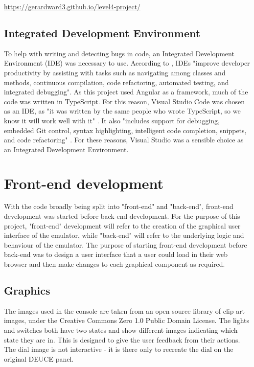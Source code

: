 \documentclass{l4proj}
\begin{document}
 \url{https://gerardward3.github.io/level4-project/}
 
\subsection{Integrated Development Environment}
To help with writing and detecting bugs in code, an Integrated Development Environment (IDE) was necessary to use. According to \citet{ide15}, IDEs "improve developer productivity by assisting with tasks such as navigating among classes and methods, continuous compilation, code refactoring, automated testing, and integrated debugging". As this project used Angular as a framework, much of the code was written in TypeScript. For this reason, Visual Studio Code was chosen as an IDE, as "it was written by the same people who wrote TypeScript, so we know it will work well with it" \citep{visualstudio18}. It also "includes support for debugging, embedded Git control, syntax highlighting, intelligent code completion, snippets, and code refactoring" \citep{visualstudio18}. For these reasons, Visual Studio was a sensible choice as an Integrated Development Environment.

\section{Front-end development}
With the code broadly being split into "front-end" and "back-end", front-end development was started before back-end development. For the purpose of this project, "front-end" development will refer to the creation of the graphical user interface of the emulator, while "back-end" will refer to the underlying logic and behaviour of the emulator. The purpose of starting front-end development before back-end was to design a user interface that a user could load in their web browser and then make changes to each graphical component as required. 

\subsection{Graphics}
The images used in the console are taken from an open source library of clip art images, under the Creative Commons Zero 1.0 Public Domain License. The lights and switches both have two states and show different images indicating which state they are in. This is designed to give the user feedback from their actions. The dial image is not interactive - it is there only to recreate the dial on the original DEUCE panel.
\end{document}
